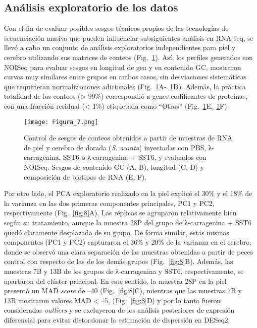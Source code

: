 \documentclass[10pt,a4paper]{article}
\begin{document}
\subsection{Análisis exploratorio de los datos}
Con el fin de evaluar posibles sesgos técnicos propios de las tecnologías de secuenciación masiva que pueden influenciar subsiguientes análisis en RNA-seq, se llevó a cabo un conjunto de análisis exploratorios independientes para piel y cerebro utilizando sus matrices de conteos (Fig.~\ref{fig:7}). Así, los perfiles generados con NOISeq para evaluar sesgos en longitud de gen y en contenido GC, mostraron curvas muy similares entre grupos en ambos casos, sin desviaciones sistemáticas que requirieran normalizaciones adicionales (Fig.~\ref{fig:7}A-~\ref{fig:7}D). Además, la práctica totalidad de los conteos (> 99\%) correspondió a genes codificantes de proteínas, con una fracción residual (< 1\%) etiquetada como “Otros” (Fig.~\ref{fig:7}E,~\ref{fig:7}F). 

\begin{figure}[ht]
  \centering
 \texttt{[image: Figura\_7.png]}
 
  \caption{Control de sesgos de conteos obtenidos a partir de muestras de RNA de piel y cerebro de dorada (\textit{S. aurata}) inyectadas con PBS, λ-carragenina, SST6 o λ-carragenina + SST6, y evaluados con NOISeq. Sesgos de contenido GC (A, B), longitud (C, D) y composición de biotipos de RNA (E, F).}
  \label{fig:7}
\end{figure}

\newpage
Por otro lado, el PCA exploratorio realizado en la piel explicó el 30\% y el 18\% de la varianza en las dos primeras componentes principales, PC1 y PC2, respectivamente (Fig.~\ref{fig:8}A). Las réplicas se agruparon relativamente bien según su tratamiento, aunque la muestra 28P del grupo de λ-carragenina + SST6 quedó claramente desplazada de su grupo. De forma similar, estas mismas componentes (PC1 y PC2) capturaron el 36\% y 20\% de la varianza en el cerebro, donde se observó una clara separación de las muestras obtenidas a partir de peces control con respecto de las de los demás grupos (Fig.~\ref{fig:8}B). Además, las muestras 7B y 13B de los grupos de λ-carragenina y SST6, respectivamente, se apartaron del clúster principal. En este sentido, la muestra 28P en la piel presentó un MAD \textit{score} de –40 (Fig.~\ref{fig:8}C), mientras que las muestras 7B y 13B mostraron valores MAD < –5, (Fig.~\ref{fig:8}D) y por lo tanto fueron consideradas \textit{outliers} y se excluyeron de los análisis posteriores de expresión diferencial para evitar distorsionar la estimación de dispersión en DESeq2.
\end{document}
